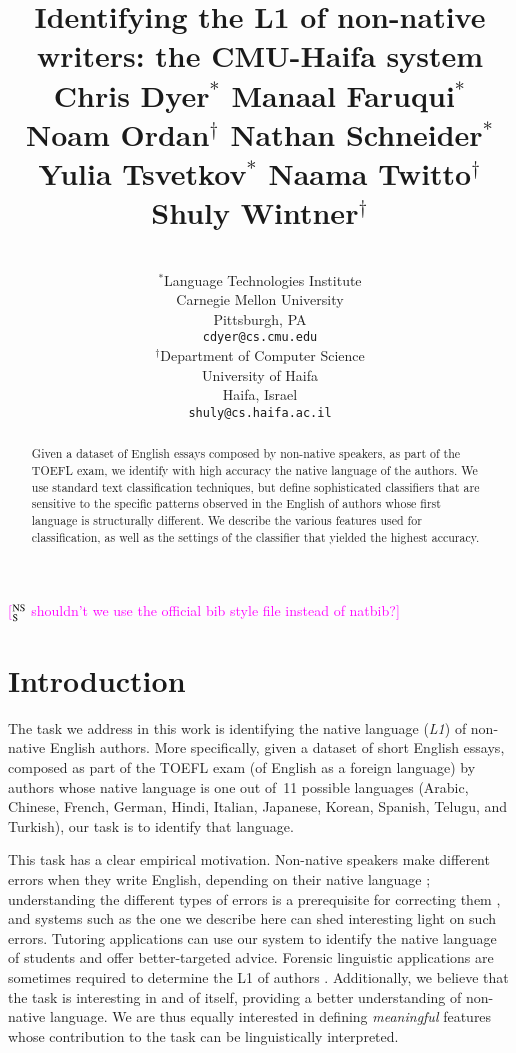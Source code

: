 \documentclass[11pt,letterpaper]{article}
\title{Identifying the L1 of non-native writers: the CMU-Haifa system\\[1em]
{\large Chris Dyer$^\ast$ Manaal Faruqui$^\ast$ Noam Ordan$^\dagger$ Nathan Schneider$^\ast$\\ Yulia Tsvetkov$^\ast$ Naama Twitto$^\dagger$ Shuly Wintner$^\dagger$}\\[-3em]
}
\author{
\\
$^\ast$Language Technologies Institute\\Carnegie Mellon University\\Pittsburgh, PA\\\texttt{cdyer@cs.cmu.edu}
\And
\\
$^\dagger$Department of Computer Science\\University of Haifa\\Haifa, Israel\\\texttt{shuly@cs.haifa.ac.il}
%
%
%
%
}
\date{}
\newcommand{\ensuretext}[1]{#1}
\newcommand{\nssmarker}{\ensuretext{\textcolor{magenta}{\ensuremath{^{\textsc{NS}}_{\textsc{S}}}}}}
\newcommand{\arkcomment}[3]{\ensuretext{\textcolor{#3}{[#1 #2]}}}
\newcommand{\nss}[1]{\arkcomment{\nssmarker}{#1}{magenta}}
\begin{document}
\maketitle
\begin{abstract}
Given a dataset of English essays composed by non-native speakers, as
part of the TOEFL exam, we identify with high accuracy the native
language of the authors. We use standard text classification
techniques, but define sophisticated classifiers that are sensitive to
the specific patterns observed in the English of authors whose first
language is structurally different. We describe the various features
used for classification, as well as the settings of the classifier
that yielded the highest accuracy.
\end{abstract}

\nss{shouldn't we use the official bib style file instead of natbib?}

\section{Introduction}
\label{sec:intro}
The task we address in this work is identifying the native language
(\emph{L1}) of non-native English authors. More specifically, given a
dataset
\citep{blanchard-tetreault-higgins-cahill-chodorow:2013:TOEFL11-RR} of
short English essays, composed as part of the TOEFL exam (of English
as a foreign language) by authors whose native language is one out
of~11 possible languages (Arabic, Chinese, French, German, Hindi,
Italian, Japanese, Korean, Spanish, Telugu, and Turkish), our task is
to identify that language.

This task has a clear empirical motivation. Non-native speakers make
different errors when they write English, depending on their native
language \citep{swan2001learner}; understanding the different types of
errors is a prerequisite for correcting them
\citep{Leacock:2010:AGE:1855062}, and systems such as the one we
describe here can shed interesting light on such errors. Tutoring
applications can use our system to identify the native language of
students and offer better-targeted advice. Forensic linguistic
applications are sometimes required to determine the L1 of authors
\citep{estival-gaustad-pham-radford-hutchinson:2007:ALTA2007,estival2007author}. Additionally,
we believe that the task is interesting in and of itself, providing a
better understanding of non-native language. We are thus equally
interested in defining \emph{meaningful} features whose contribution
to the task can be linguistically interpreted.
\end{document}
